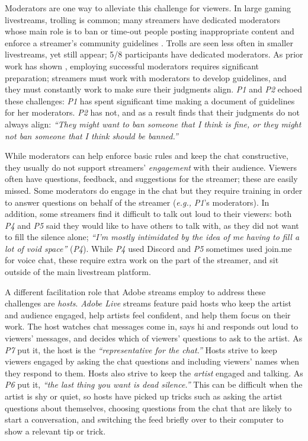 Moderators are one way to alleviate this challenge for viewers. In large gaming livestreams, trolling is common; many streamers have dedicated moderators whose main role is to ban or time-out people posting inappropriate content and enforce a streamer's community guidelines \cite{Seering2017, Lo2018, Seering2019, YvetteWohn2019}. Trolls are seen less often in smaller livestreams, yet still appear; 5/8 participants have dedicated moderators. As prior work has shown  \cite{Lo2018, Seering2019, YvetteWohn2019}, employing successful moderators requires significant preparation; streamers must work with moderators to develop guidelines, and they must constantly work to make sure their judgments align. \textit{P1} and \textit{P2} echoed these challenges: \textit{P1} has spent significant time making a document of guidelines for her moderators. \textit{P2} has not, and as a result finds that their judgments do not always align: \textit{``They might want to ban someone that I think is fine, or they might not ban someone that I think should be banned.''}

While moderators can help enforce basic rules and keep the chat constructive, they usually do not support streamers' \textit{engagement} with their audience. Viewers often have questions, feedback, and suggestions for the streamer; these are easily missed. Some moderators do engage in the chat \cite{YvetteWohn2019} but they require training in order to answer questions on behalf of the streamer (\textit{e.g.,} \textit{P1}'s moderators). In addition, some streamers find it difficult to talk out loud to their viewers: both \textit{P4} and \textit{P5} said they would like to have others to talk with, as they did not want to fill the silence alone; \textit{``I'm mostly intimidated by the idea of me having to fill a lot of void space''} (\textit{P4}). While \textit{P4} used Discord and \textit{P5} sometimes used join.me for voice chat, these require extra work on the part of the streamer, and sit outside of the main livestream platform.

A different facilitation role that Adobe streams employ to address these challenges are \textit{hosts}. \textit{Adobe Live} streams feature paid hosts who keep the artist and audience engaged, help artists feel confident, and help them focus on their work. The host watches chat messages come in, says hi and responds out loud to viewers' messages, and decides which of viewers' questions to ask to the artist. As \textit{P7} put it, the host is the \textit{``representative for the chat.''} Hosts strive to keep viewers engaged by asking the chat questions and including viewers' names when they respond to them. Hosts also strive to keep the \textit{artist} engaged and talking. As \textit{P6} put it, \textit{``the last thing you want is dead silence.''} This can be difficult when the artist is shy or quiet, so hosts have picked up tricks such as asking the artist questions about themselves, choosing questions from the chat that are likely to start a conversation, and switching the feed briefly over to their computer to show a relevant tip or trick.


